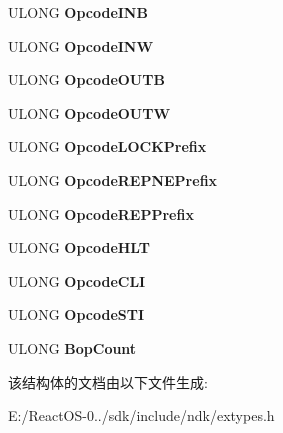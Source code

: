 \begin{DoxyCompactItemize}
U\+L\+O\+NG {\bfseries Opcode\+I\+NB}
\item 
\mbox{\label{struct___s_y_s_t_e_m___v_d_m___i_n_s_t_e_m_u_l___i_n_f_o_ab90bb583078b78863a2cd3cf79a28bd9}} 
U\+L\+O\+NG {\bfseries Opcode\+I\+NW}
\item 
\mbox{\label{struct___s_y_s_t_e_m___v_d_m___i_n_s_t_e_m_u_l___i_n_f_o_ae6be54d15575b786943802054c35575f}} 
U\+L\+O\+NG {\bfseries Opcode\+O\+U\+TB}
\item 
\mbox{\label{struct___s_y_s_t_e_m___v_d_m___i_n_s_t_e_m_u_l___i_n_f_o_aedff37724cf9e6ef46e17cca2e67cc17}} 
U\+L\+O\+NG {\bfseries Opcode\+O\+U\+TW}
\item 
\mbox{\label{struct___s_y_s_t_e_m___v_d_m___i_n_s_t_e_m_u_l___i_n_f_o_ac25bc5415c81e587f4a53915f00c0d7b}} 
U\+L\+O\+NG {\bfseries Opcode\+L\+O\+C\+K\+Prefix}
\item 
\mbox{\label{struct___s_y_s_t_e_m___v_d_m___i_n_s_t_e_m_u_l___i_n_f_o_a5b204b1f70646e56190089749da09ebb}} 
U\+L\+O\+NG {\bfseries Opcode\+R\+E\+P\+N\+E\+Prefix}
\item 
\mbox{\label{struct___s_y_s_t_e_m___v_d_m___i_n_s_t_e_m_u_l___i_n_f_o_aef33dc1175358fc5ce0abdc0f8183f2c}} 
U\+L\+O\+NG {\bfseries Opcode\+R\+E\+P\+Prefix}
\item 
\mbox{\label{struct___s_y_s_t_e_m___v_d_m___i_n_s_t_e_m_u_l___i_n_f_o_ae53dbd240b86bbb958448a42cec65500}} 
U\+L\+O\+NG {\bfseries Opcode\+H\+LT}
\item 
\mbox{\label{struct___s_y_s_t_e_m___v_d_m___i_n_s_t_e_m_u_l___i_n_f_o_acfc51790ba622230440d22450e910c2d}} 
U\+L\+O\+NG {\bfseries Opcode\+C\+LI}
\item 
\mbox{\label{struct___s_y_s_t_e_m___v_d_m___i_n_s_t_e_m_u_l___i_n_f_o_aeae04e514eb1ebf8a2060e2fd6bf4d8a}} 
U\+L\+O\+NG {\bfseries Opcode\+S\+TI}
\item 
\mbox{\label{struct___s_y_s_t_e_m___v_d_m___i_n_s_t_e_m_u_l___i_n_f_o_aaa480f1498532a403dbeadf717701e9b}} 
U\+L\+O\+NG {\bfseries Bop\+Count}
\end{DoxyCompactItemize}


该结构体的文档由以下文件生成\+:\begin{DoxyCompactItemize}
\item 
E\+:/\+React\+O\+S-\/0../sdk/include/ndk/extypes.\+h\end{DoxyCompactItemize}
